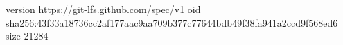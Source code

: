 version https://git-lfs.github.com/spec/v1
oid sha256:43f33a18736cc2af177aac9aa709b377c77644bdb49f38fa941a2ccd9f568ed6
size 21284
